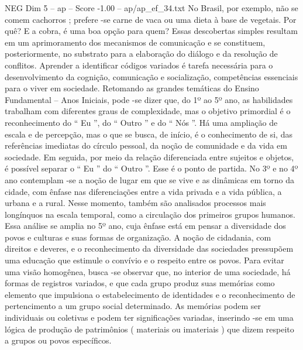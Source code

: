 \begin{textsample}{NEG Dim 5 – ap – Score -1.00 – ap/ap\_ef\_34.txt}
No Brasil, por exemplo, não se comem cachorros ; prefere -se carne de vaca ou uma dieta à base de vegetais.
Por quê?
E a cobra, é uma boa opção para quem?
Essas descobertas simples resultam em um aprimoramento dos mecanismos de comunicação e se constituem, posteriormente, no substrato para a elaboração do diálogo e da resolução de conflitos.
Aprender a identificar códigos variados é tarefa necessária para o desenvolvimento da cognição, comunicação e socialização, competências essenciais para o viver em sociedade.
Retomando as grandes temáticas do Ensino Fundamental – Anos Iniciais, pode -se dizer que, do 1º ao 5º ano, as habilidades trabalham com diferentes graus de complexidade, mas o objetivo primordial é o reconhecimento do “ Eu ”, do “ Outro ” e do “ Nós ”.
Há uma ampliação de escala e de percepção, mas o que se busca, de início, é o conhecimento de si, das referências imediatas do círculo pessoal, da noção de comunidade e da vida em sociedade.
Em seguida, por meio da relação diferenciada entre sujeitos e objetos, é possível separar o “ Eu ” do “ Outro ”.
Esse é o ponto de partida.
No 3º e no 4º ano contemplam -se a noção de lugar em que se vive e as dinâmicas em torno da cidade, com ênfase nas diferenciações entre a vida privada e a vida pública, a urbana e a rural.
Nesse momento, também são analisados processos mais longínquos na escala temporal, como a circulação dos primeiros grupos humanos.
Essa análise se amplia no 5º ano, cuja ênfase está em pensar a diversidade dos povos e culturas e suas formas de organização.
A noção de cidadania, com direitos e deveres, e o reconhecimento da diversidade das sociedades pressupõem uma educação que estimule o convívio e o respeito entre os povos.
Para evitar uma visão homogênea, busca -se observar que, no interior de uma sociedade, há formas de registros variados, e que cada grupo produz suas memórias como elemento que impulsiona o estabelecimento de identidades e o reconhecimento de pertencimento a um grupo social determinado.
As memórias podem ser individuais ou coletivas e podem ter significações variadas, inserindo -se em uma lógica de produção de patrimônios ( materiais ou imateriais ) que dizem respeito a grupos ou povos específicos.

\end{textsample}
